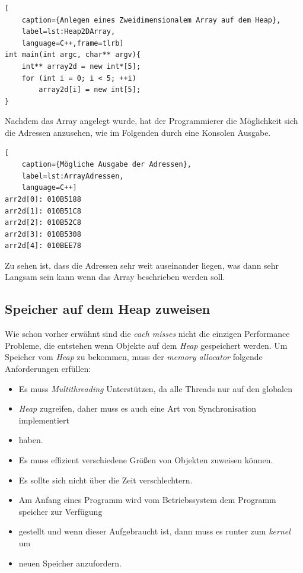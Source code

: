 \begin{lstlisting}[
    caption={Anlegen eines Zweidimensionalem Array auf dem Heap},
    label=lst:Heap2DArray,
    language=C++,frame=tlrb]
int main(int argc, char** argv){
	int** array2d = new int*[5];
	for (int i = 0; i < 5; ++i)
		array2d[i] = new int[5];
}
\end{lstlisting}

Nachdem das Array angelegt wurde, hat der Programmierer die Möglichkeit sich die Adressen
anzusehen, wie im Folgenden durch eine Konsolen Ausgabe.

\begin{lstlisting}[
    caption={Mögliche Ausgabe der Adressen},
    label=lst:ArrayAdressen,
    language=C++]
arr2d[0]: 010B5188
arr2d[1]: 010B51C8
arr2d[2]: 010B52C8
arr2d[3]: 010B5308
arr2d[4]: 010BEE78
\end{lstlisting}

Zu sehen ist, dass die Adressen sehr weit auseinander liegen, was dann sehr Langsam sein kann
wenn das Array beschrieben werden soll.

\subsection{Speicher auf dem Heap zuweisen}
Wie schon vorher erwähnt sind die \emph{cach misses} nicht die einzigen Performance Probleme, die
entstehen wenn Objekte auf dem \emph{Heap} gespeichert werden. Um Speicher vom \emph{Heap} zu
bekommen, muss der \emph{memory allocator} folgende Anforderungen erfüllen:

\begin{itemize}
    \item Es muss \emph{Multithreading} Unterstützen, da alle Threads nur auf den globalen
    \item \emph{Heap} zugreifen, daher muss es auch eine Art von Synchronisation implementiert
    \item haben.
    \item Es muss effizient verschiedene Größen von Objekten zuweisen können.
    \item Es sollte sich nicht über die Zeit verschlechtern.
    \item Am Anfang eines Programm wird vom Betriebssystem dem Programm speicher zur Verfügung
    \item gestellt und wenn dieser Aufgebraucht ist, dann muss es runter zum \emph{kernel} um
    \item neuen Speicher anzufordern.
\end{itemize}

